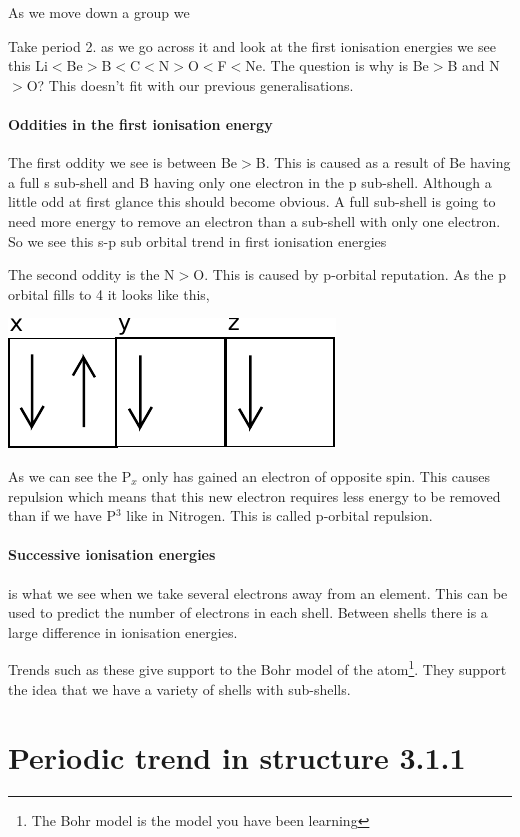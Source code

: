 \documentclass[11pt,a4paper]{memoir}
\begin{document}
	As we move down a group we
	
	Take period 2. as we go across it and look at the first ionisation energies we see this Li$<$Be$>$B$<$C$<$N$>$O$<$F$<$Ne. The question is why is Be$>$B and N$>$O? This doesn't fit with our previous generalisations.
	
	\paragraph{Oddities in the first ionisation energy} The first oddity we see is between Be$>$B. This is caused as a result of Be having a full s sub-shell and B having only one electron in the p sub-shell. Although a little odd at first glance this should become obvious. A full sub-shell is going to need more energy to remove an electron than a sub-shell with only one electron. So we see this s-p sub orbital trend in first ionisation energies
	
	The second oddity is the N$>$O. This is caused by p-orbital reputation. As the p orbital fills to 4 it looks like this,
	\begin{center}
		\includegraphics{P4orbital}
	\end{center}
	As we can see the P$_x$ only has gained an electron of opposite spin. This causes repulsion which means that this new electron requires less energy to be removed than if we have P$^3$ like in Nitrogen. This is called p-orbital repulsion.
	
	\paragraph{Successive ionisation energies} is what we see when we take several electrons away from an element. This can be used to predict the number of electrons in each shell. Between shells there is a large difference in ionisation energies.
	
	Trends such as these give support to the Bohr model of the atom\footnote{The Bohr model is the model you have been learning}. They support the idea that we have a variety of shells with sub-shells.
	
\section{Periodic trend in structure 3.1.1}
	
\end{document}
